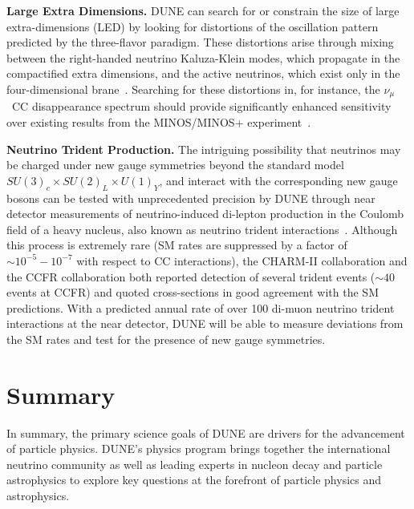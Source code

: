 {\bf Large Extra Dimensions.}
DUNE can search for or constrain the size of large extra-dimensions (LED) by looking for distortions of the oscillation pattern predicted by the three-flavor paradigm. These distortions arise through mixing between the right-handed neutrino Kaluza-Klein modes, which propagate in the compactified extra dimensions, and the active neutrinos, which exist only in the four-dimensional brane~\cite{Dvali:1999cn}. Searching for these distortions in, for instance, the $\nu_\mu$~CC disappearance spectrum should provide significantly enhanced sensitivity over existing results from the MINOS/MINOS+ experiment~\cite{Adamson:2016yvy}.

{\bf Neutrino Trident Production.}
The intriguing possibility that neutrinos may be charged under new gauge symmetries beyond the standard model $SU(3)_c\times SU(2)_L\times U(1)_Y$, and interact with the corresponding new gauge bosons can be tested with unprecedented precision by DUNE through near detector measurements of neutrino-induced di-lepton production in the Coulomb field of a heavy nucleus, also known as  neutrino trident interactions~\cite{Altmannshofer:2014pba}. Although this process is extremely rare (SM rates are suppressed by a factor of $\sim 10^{-5}-10^{-7}$ with respect to CC interactions), the CHARM-II collaboration \cite{Geiregat:1990gz} and the CCFR collaboration \cite{Mishra:1991bv} both reported detection of several trident events ($\sim 40$ events at CCFR) and quoted cross-sections in good agreement with the SM predictions. With a predicted annual rate of over 100 di-muon neutrino trident interactions at the near detector, DUNE will be able to measure deviations from the SM rates and test for the presence of new gauge symmetries.



\section{Summary}

In summary, the primary science goals of DUNE are drivers for the
advancement of particle physics. DUNE's physics program brings together the 
international neutrino community as well as leading experts in nucleon decay
and particle astrophysics to explore key questions at the forefront of
particle physics and astrophysics.

